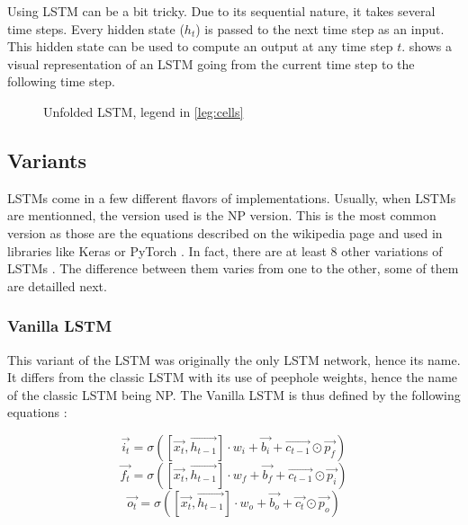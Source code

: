Using \ac{LSTM} can be a bit tricky. Due to its sequential nature, it takes several time steps. Every hidden state ($h_t$) is passed to the next time step as an input. This hidden state can be used to compute an output at any time step $t$.  shows a visual representation of an \ac{LSTM} going from the current time step to the following time step.

\begin{figure}[H]
  \centering
  
  \caption{Unfolded \acs{LSTM}, legend in \cref{leg:cells}}
  \label{fig:lstmUse}
\end{figure}

\subsection{Variants}

\acp{LSTM} come in a few different flavors of implementations. Usually, when \acp{LSTM} are mentionned, the version used is the \ac{NP} version. This is the most common version as those are the equations described on the wikipedia page \cite{wikiLSTM} and used in libraries like Keras \cite{Keras} or PyTorch \cite{PyTorch}. In fact, there are at least 8 other variations of \acp{LSTM} \cite{nbLSTM}.
The difference between them varies from one to the other, some of them are detailled next.

\subsubsection{Vanilla \ac{LSTM}}
This variant of the \ac{LSTM} was originally the only \ac{LSTM} network, hence its name. It differs from the classic \ac{LSTM} with its use of peephole weights, hence the name of the classic \ac{LSTM} being \acl{NP}. The Vanilla \ac{LSTM} is thus defined by the following equations \cite{vanillaLSTM, nbLSTM} :

\begin{equation}\label{eq:inputGVanilla}
  \overrightarrow{i_t}=\sigma ([\overrightarrow{x_{t}},\overrightarrow{h_{t-1}}]\cdot w_i + \overrightarrow{b_i} +\overrightarrow{c_{t-1}}\odot \overrightarrow{p_f})
\end{equation}
\begin{equation}\label{eq:forgetGVanilla}
  \overrightarrow{f_t}=\sigma ([\overrightarrow{x_{t}},\overrightarrow{h_{t-1}}]\cdot w_f + \overrightarrow{b_f}+\overrightarrow{c_{t-1}}\odot \overrightarrow{p_i})
\end{equation}
\begin{equation}\label{eq:ouputGVanilla}
  \overrightarrow{o_t}=\sigma ([\overrightarrow{x_{t}},\overrightarrow{h_{t-1}}]\cdot w_o + \overrightarrow{b_o}+\overrightarrow{c_{t}}\odot \overrightarrow{p_o})
\end{equation}

